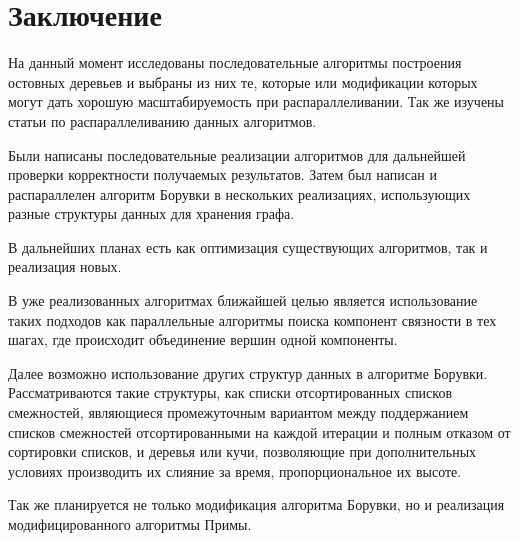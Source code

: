 \documentclass{article}
\begin{document}

\newpage
\section{Заключение}
На данный момент исследованы последовательные алгоритмы построения остовных деревьев и выбраны из них те, которые или модификации которых могут дать хорошую масштабируемость при распараллеливании. Так же изучены статьи  \cite{dense-mst,boruvka-prima,boruvka-cm5} по распараллеливанию данных алгоритмов.

Были написаны последовательные реализации алгоритмов для дальнейшей проверки корректности получаемых результатов. Затем был написан и распараллелен алгоритм Борувки в нескольких реализациях, использующих разные структуры данных для хранения графа.

В дальнейших планах есть как оптимизация существующих алгоритмов, так и реализация новых.

В уже реализованных алгоритмах ближайшей целью является использование таких подходов как параллельные алгоритмы поиска компонент связности в тех шагах, где происходит объединение вершин одной компоненты.

Далее возможно использование других  структур данных в алгоритме Борувки. Рассматриваются такие структуры, как списки отсортированных списков смежностей, являющиеся промежуточным вариантом между поддержанием списков смежностей отсортированными на каждой итерации и полным отказом от сортировки списков, и деревья или кучи, позволяющие при дополнительных условиях производить их слияние за время, пропорциональное их высоте.

Так же планируется не только модификация алгоритма Борувки, но и реализация модифицированного алгоритмы Примы.

\newpage


\end{document}
